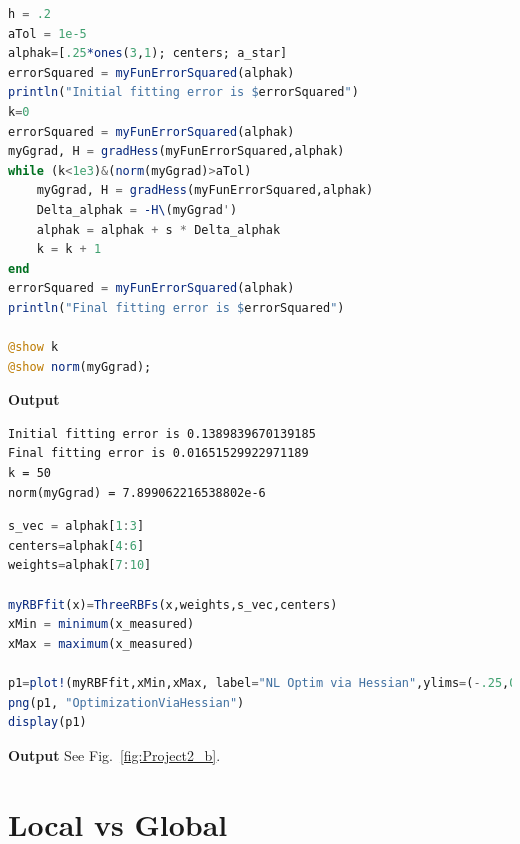 \begin{lstlisting}[language=Julia,style=mystyle]
h = .2
aTol = 1e-5
alphak=[.25*ones(3,1); centers; a_star]
errorSquared = myFunErrorSquared(alphak)
println("Initial fitting error is $errorSquared")
k=0
errorSquared = myFunErrorSquared(alphak)
myGgrad, H = gradHess(myFunErrorSquared,alphak)
while (k<1e3)&(norm(myGgrad)>aTol)
    myGgrad, H = gradHess(myFunErrorSquared,alphak)
    Delta_alphak = -H\(myGgrad')
    alphak = alphak + s * Delta_alphak
    k = k + 1
end
errorSquared = myFunErrorSquared(alphak)
println("Final fitting error is $errorSquared")

@show k
@show norm(myGgrad);
\end{lstlisting}
\textbf{Output} 
\begin{verbatim}
Initial fitting error is 0.1389839670139185
Final fitting error is 0.01651529922971189
k = 50
norm(myGgrad) = 7.899062216538802e-6
\end{verbatim}


\begin{lstlisting}[language=Julia,style=mystyle]
s_vec = alphak[1:3]
centers=alphak[4:6]
weights=alphak[7:10]

myRBFfit(x)=ThreeRBFs(x,weights,s_vec,centers)
xMin = minimum(x_measured)
xMax = maximum(x_measured)

p1=plot!(myRBFfit,xMin,xMax, label="NL Optim via Hessian",ylims=(-.25,0.45))
png(p1, "OptimizationViaHessian") 
display(p1)
\end{lstlisting}
\textbf{Output} 
See Fig.~\ref{fig:Project2_b}.







\section{Local vs Global}


